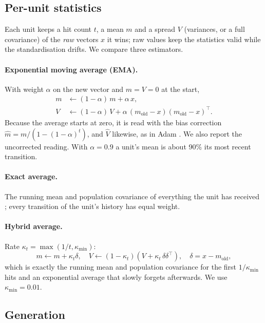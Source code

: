 \documentclass{article}
\begin{document}
\subsection{Per-unit statistics}
\label{sec:stats}

Each unit keeps a hit count $t$, a mean $m$ and a spread $V$ (variances, or
a full covariance) of the \emph{raw} vectors $x$ it wins; raw values keep the
statistics valid while the standardisation drifts. We compare three
estimators.

\paragraph{Exponential moving average (EMA).} With weight $\alpha$ on the
new vector and $m = V = 0$ at the start,
\begin{align}
  m &\leftarrow (1 - \alpha)\, m + \alpha\, x, \label{eq:ema-mean}\\
  V &\leftarrow (1 - \alpha)\, V + \alpha\, (m_{\text{old}} - x)(m_{\text{old}} - x)^\top .
  \label{eq:ema-var}
\end{align}
Because the average starts at zero, it is read with the bias correction
$\hat{m} = m / (1 - (1-\alpha)^t)$, and $\hat{V}$ likewise, as in Adam
\citep{kingma2015adam}. We also report the uncorrected reading. With
$\alpha = 0.9$ a unit's mean is about 90\% its most recent transition.

\paragraph{Exact average.} The running mean and population covariance of
everything the unit has received \citep{welford1962note}; every transition
of the unit's history has equal weight.

\paragraph{Hybrid average.} Rate $\kappa_t = \max(1/t, \kappa_{\min})$:
\begin{equation}
  m \leftarrow m + \kappa_t \delta, \quad
  V \leftarrow (1 - \kappa_t)(V + \kappa_t\, \delta\delta^\top), \quad
  \delta = x - m_{\text{old}},
  \label{eq:hybrid}
\end{equation}
which is exactly the running mean and population covariance for the first
$1/\kappa_{\min}$ hits and an exponential average that slowly forgets
afterwards. We use $\kappa_{\min} = 0.01$.

\subsection{Generation}
\label{sec:generation}
\end{document}
